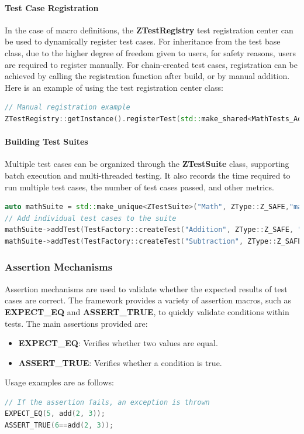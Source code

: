 \documentclass[english]{article}
\begin{document}
\paragraph{Test Case Registration} In the case of macro definitions, the \textbf{ZTestRegistry} test registration center can be used to dynamically register test cases. For inheritance from the test base class, due to the higher degree of freedom given to users, for safety reasons, users are required to register manually. For chain-created test cases, registration can be achieved by calling the registration function after build, or by manual addition.
Here is an example of using the test registration center class:
\begin{lstlisting}[language=C++]
// Manual registration example
ZTestRegistry::getInstance().registerTest(std::make_shared<MathTests_Addition>());
\end{lstlisting}
\paragraph{Building Test Suites}
Multiple test cases can be organized through the \textbf{ZTestSuite} class, supporting batch execution and multi-threaded testing. It also records the time required to run multiple test cases, the number of test cases passed, and other metrics.

\begin{lstlisting}[language=C++]
auto mathSuite = std::make_unique<ZTestSuite>("Math", ZType::Z_SAFE,"math test");
// Add individual test cases to the suite
mathSuite->addTest(TestFactory::createTest("Addition", ZType::Z_SAFE, "", add, 2, 3).setExpectedOutput(5).build());
mathSuite->addTest(TestFactory::createTest("Subtraction", ZType::Z_SAFE, "", subtract, 5, 3).setExpectedOutput(2).build());
\end{lstlisting}



\subsubsection{Assertion Mechanisms}
Assertion mechanisms are used to validate whether the expected results of test cases are correct. The framework provides a variety of assertion macros, such as \textbf{EXPECT\_EQ} and \textbf{ASSERT\_TRUE}, to quickly validate conditions within tests.
The main assertions provided are:
\begin{itemize}
    \item \textbf{EXPECT\_EQ}: Verifies whether two values are equal.
    \item \textbf{ASSERT\_TRUE}: Verifies whether a condition is true.
\end{itemize}
Usage examples are as follows:
\begin{lstlisting}[language=C++]
// If the assertion fails, an exception is thrown
EXPECT_EQ(5, add(2, 3));
ASSERT_TRUE(6==add(2, 3));
\end{lstlisting}
\end{document}

